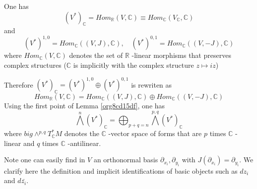 \documentclass[11pt]{article}
\begin{document}
One has 
\[
(V^*)_{\mathbb{C}} = Hom_{\mathbb{R}}(V,\mathbb{C}) \equiv Hom_{\mathbb{C}}(V_{\mathbb{C}},
\mathbb{C})
\]
and 
\[
(V^*)^{1,0} = Hom_{\mathbb{C}}((V,J), \mathbb{C}),\quad (V^*)^{0,1} = Hom_{\mathbb{C}}((V,-J),\mathbb{C})
\]
where \(Hom_{\mathbb{C}}(V,\mathbb{C})\) denotes the set of \(\mathbb{R}\) -linear morphisms that preserves
complex structures (\(\mathbb{C}\) is implicitly with the complex structure \(z\mapsto iz\))

Therefore \((V^*)_{\mathbb{C}} = (V^*)^{1,0} \oplus (V^{*})^{0,1}\) is rewriten as
\[
Hom_{\mathbb{R}}(V,\mathbb{C}) = Hom_{\mathbb{C}}((V,J),\mathbb{C}) \oplus Hom_{\mathbb{C}}((V,-J), \mathbb{C})
\]
Using the first point of Lemma \ref{org8cd15df}, one has
\[
\bigwedge^n (V^*)_{\mathbb{C}} = \bigoplus_{p+q=n}\bigwedge^{p,q}(V^*)_{\mathbb{C}}
\]
where \(big\wedge^{p,q}T^*_{\mathbb{C}}M\) denotes the \(\mathbb{C}\) -vector space of forms that are \(p\) times \(\mathbb{C}\) -linear and \(q\) times \(\mathbb{C}\) -antilinear.


Note one can easily find in \(V\) an orthonormal basis \(\partial_{x_i},\partial_{y_i}\) with
\(J(\partial_{x_i}) = \partial_{y_i}\). We clarify here the definition and implicit identifications of
basic objects such as \(dz_i\) and \(d\bar{z_i}\).
\end{document}
